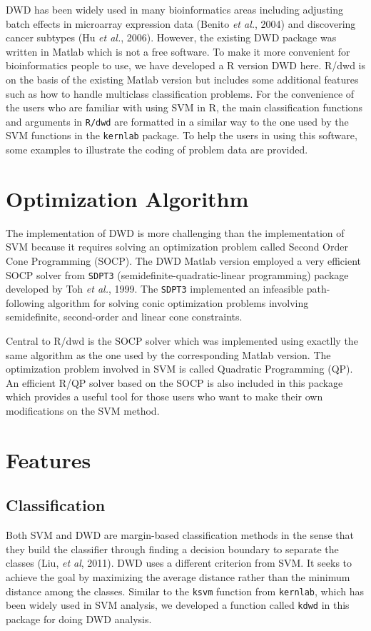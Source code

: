 \documentclass{bioinfo}
\begin{document}
DWD has been widely used in many bioinformatics areas including adjusting batch
effects in microarray expression data (Benito {\em et al.}, 2004) and
discovering cancer subtypes (Hu {\em et al.}, 2006). However, the existing
DWD package was written in Matlab which is not a free software. To make it more
convenient for bioinformatics people to use, we have developed a R version DWD
here. R/dwd is on the basis of the existing Matlab version but includes some
additional features such as how to handle multiclass classification problems. For the
convenience of the users who are familiar with using SVM in R, the main
classification functions and arguments in \texttt{R/dwd} are formatted in a
similar way to the one used by the SVM functions in the \texttt{kernlab}
package. To help the users in using this software, some examples to illustrate
the coding of problem data are provided.

\section{Optimization Algorithm}
The implementation of DWD is more challenging than the implementation of SVM
because it requires solving an optimization problem called Second Order 
Cone Programming (SOCP).  The DWD Matlab version employed a very
efficient SOCP solver from \texttt{SDPT3} (semidefinite-quadratic-linear
programming) package developed by Toh {\em et al.}, 1999. The \texttt{SDPT3}
implemented an infeasible path-following algorithm for solving conic
optimization problems involving semidefinite, second-order and linear cone
constraints.

Central to R/dwd is the SOCP solver which was implemented using exactlly the
same algorithm as the one used by the corresponding Matlab version. The
optimization problem involved in SVM is called Quadratic Programming (QP). An
efficient R/QP solver based on the SOCP is also included in this package which
provides a useful tool for those users who want to make their own modifications
on the SVM method.

\section{Features}

\subsection{Classification}
Both SVM and DWD are margin-based classification methods in the sense that they
build the classifier through finding a decision boundary to separate the
classes (Liu, {\em et al}, 2011). DWD uses a different criterion from SVM. It
seeks to achieve the goal by maximizing the average distance rather than the
minimum distance among the classes. Similar to the \texttt{ksvm} function from
\texttt{kernlab}, which has been widely used in SVM analysis, we developed a
function called \texttt{kdwd} in this package for doing DWD analysis.
\end{document}
